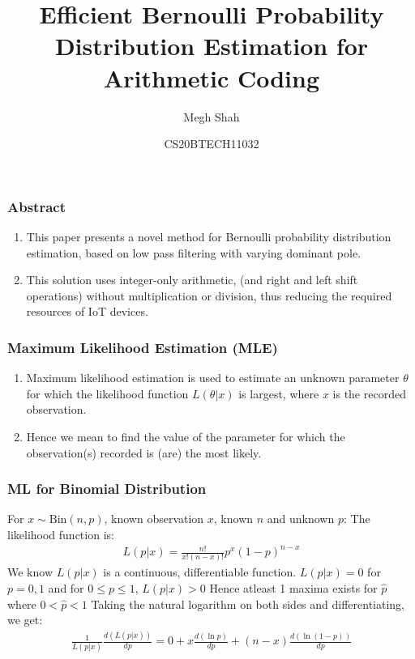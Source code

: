 \documentclass{beamer}
\title{Efficient Bernoulli Probability Distribution Estimation for Arithmetic Coding}
\author{Megh Shah}
\date{CS20BTECH11032}
\begin{document}
\begin{frame}
\titlepage
\end{frame}

\begin{frame}
\frametitle{Abstract}
\begin{enumerate}
    \item This paper presents a novel method for Bernoulli probability distribution estimation, based on low pass filtering with varying dominant pole.
    \item This solution uses integer-only arithmetic, (and right and left shift operations) without multiplication or division, thus reducing the required resources of IoT devices.
\end{enumerate}
\end{frame}

\begin{frame}
\frametitle{Maximum Likelihood Estimation (MLE)}
\begin{enumerate}
    \item Maximum likelihood estimation is used to estimate an unknown parameter $\theta$ for which the likelihood function $L(\theta|x)$ is largest, where $x$ is the recorded observation. 
    \item Hence we mean to find the value of the parameter for which the observation(s) recorded is (are) the most likely.
\end{enumerate}
\end{frame}

\begin{frame}
\frametitle{ML for Binomial Distribution}
For $x \sim \mbox{Bin}(n,p)$, known observation $x$, known $n$ and unknown $p$: 
\newline The likelihood function is: 
\begin{align}
    L(p|x) = \frac{n!}{x!(n-x)!}p^x(1-p)^{n-x}
\end{align}
We know $L(p|x)$ is a continuous, differentiable function.
\newline $L(p|x)=0$ for $p=0,1$ and for $0 \leq p \leq 1$, $L(p|x)>0$ 
\newline Hence atleast 1 maxima exists for $\hat{p}$ where $0 < \hat{p} < 1$
\newline Taking the natural logarithm on both sides and differentiating, we get:
\begin{align}
    \frac{1}{L(p|x)}\frac{d(L(p|x))}{dp} = 0 + x\frac{d(\ln p)}{dp} +(n-x)\frac{d(\ln(1-p))}{dp}
\end{align}
\end{frame}
\end{document}
